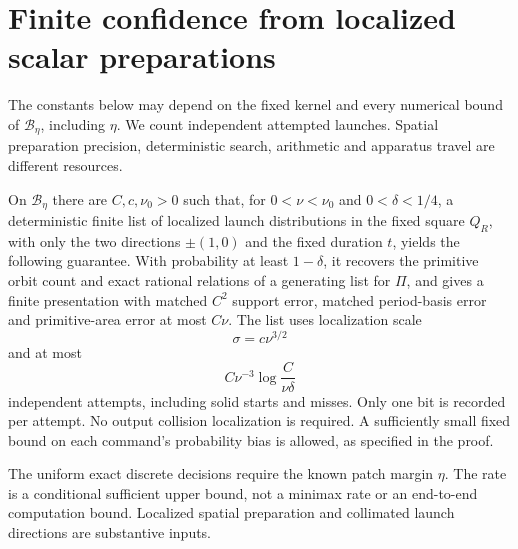 \section{Finite confidence from localized scalar preparations}
\label{sec:finite}
The constants below may depend on the fixed kernel and every numerical
bound of $\mathcal B_\eta$, including $\eta$. We count independent
attempted launches. Spatial preparation precision, deterministic search,
arithmetic and apparatus travel are different resources.

\begin{theorem}
\label{thm:finite}
On $\mathcal B_\eta$ there are $C,c,\nu_0>0$ such that, for
$0<\nu<\nu_0$ and $0<\delta<1/4$, a deterministic finite list of
localized launch distributions in the fixed square $Q_R$, with only
the two directions $\pm(1,0)$ and the fixed duration $t$, yields the
following guarantee. With probability at least $1-\delta$, it recovers
the primitive orbit count and exact rational relations of a generating
list for $\Pi$, and gives a finite presentation with matched $C^2$
support error, matched period-basis error and primitive-area error at
most $C\nu$. The list uses localization scale
\begin{equation}\label{eq:scalar-scale}
                         \sigma=c\nu^{3/2}
\end{equation}
and at most
\begin{equation}\label{eq:scalar-cost}
                    C\nu^{-3}\log\frac{C}{\nu\delta}
\end{equation}
independent attempts, including solid starts and misses. Only one bit
is recorded per attempt. No output collision localization is required.
A sufficiently small fixed bound on each command's probability bias
is allowed, as specified in the proof.

The uniform exact discrete decisions require the known patch margin
$\eta$. The rate is a conditional sufficient upper bound, not a minimax
rate or an end-to-end computation bound. Localized spatial preparation
and collimated launch directions are substantive inputs.
\end{theorem}
